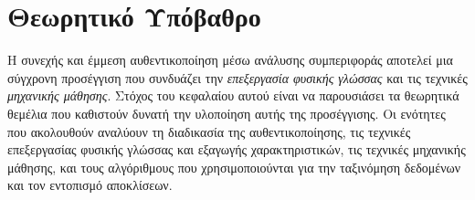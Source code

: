 \chapter{Θεωρητικό Υπόβαθρο}
\label{chapter:theory}

Η συνεχής και έμμεση αυθεντικοποίηση μέσω ανάλυσης συμπεριφοράς αποτελεί μια σύγχρονη προσέγγιση που συνδυάζει την \emph{επεξεργασία φυσικής γλώσσας} και τις τεχνικές \emph{μηχανικής μάθησης}. Στόχος του κεφαλαίου αυτού είναι να παρουσιάσει τα θεωρητικά θεμέλια που καθιστούν δυνατή την υλοποίηση αυτής της προσέγγισης. Οι ενότητες που ακολουθούν αναλύουν τη διαδικασία της αυθεντικοποίησης, τις τεχνικές επεξεργασίας φυσικής γλώσσας και εξαγωγής χαρακτηριστικών, τις τεχνικές μηχανικής μάθησης, και τους αλγόριθμους που χρησιμοποιούνται για την ταξινόμηση δεδομένων και τον εντοπισμό αποκλίσεων.




